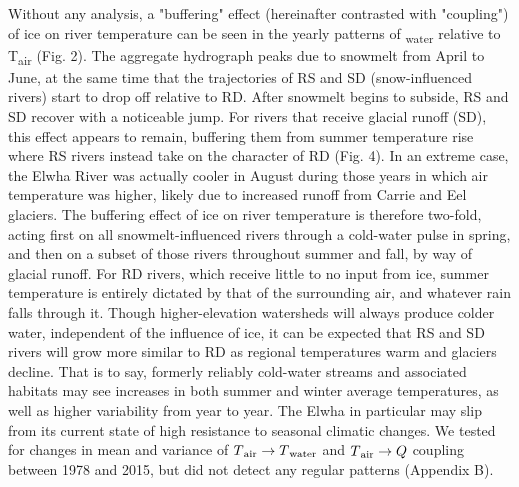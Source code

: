 \documentclass[notitlepage]{article}
\begin{document}
Without any analysis, a "buffering" effect (hereinafter contrasted with "coupling") of ice on river temperature can be seen in the yearly patterns of \textsubscript{water} relative to T\textsubscript{air} (Fig. 2). The aggregate hydrograph peaks due to snowmelt from April to June, at the same time that the trajectories of RS and SD (snow-influenced rivers) start to drop off relative to RD. After snowmelt begins to subside, RS and SD recover with a noticeable jump. For rivers that receive glacial runoff (SD), this effect appears to remain, buffering them from summer temperature rise where RS rivers instead take on the character of RD (Fig. 4). In an extreme case, the Elwha River was actually cooler in August during those years in which air temperature was higher, likely due to increased runoff from Carrie and Eel glaciers. The buffering effect of ice on river temperature is therefore two-fold, acting first on all snowmelt-influenced rivers through a cold-water pulse in spring, and then on a subset of those rivers throughout summer and fall, by way of glacial runoff. For RD rivers, which receive little to no input from ice, summer temperature is entirely dictated by that of the surrounding air, and whatever rain falls through it. Though higher-elevation watersheds will always produce colder water, independent of the influence of ice, it can be expected that RS and SD rivers will grow more similar to RD as regional temperatures warm and glaciers decline. That is to say, formerly reliably cold-water streams and associated habitats may see increases in both summer and winter average temperatures, as well as higher variability from year to year. The Elwha in particular may slip from its current state of high resistance to seasonal climatic changes. We tested for changes in mean and variance of $T\textsubscript{air}\rightarrow T\textsubscript{water}$ and $T\textsubscript{air}\rightarrow Q$ coupling between 1978 and 2015, but did not detect any regular patterns (Appendix B).
\end{document}
